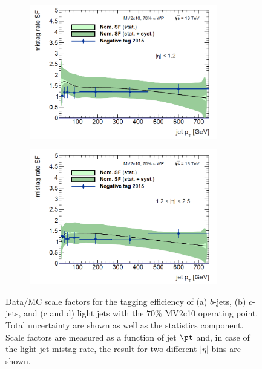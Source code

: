 \begin{figure}[h!]
\begin{subfigure}{0.5\textwidth}
  \centering
  \includegraphics[width=0.9\textwidth]{figures/Objects/LSFc.png}
  \caption{}
  \label{sec:obj:fig:lSFc}
\end{subfigure}
\begin{subfigure}{0.5\textwidth}
  \centering
  \includegraphics[width=0.9\textwidth]{figures/Objects/LSFf.png}
  \caption{}
  \label{sec:obj:fig:lSFf}
\end{subfigure}

\captionsetup{width=0.85\textwidth} \caption{\small Data/MC scale factors for the tagging efficiency of (a) $b$-jets, (b) $c$-jets, and (c and d) light jets with the $70\%$ MV2c10 operating point. Total uncertainty are shown as well as the statistics component. Scale factors are measured as a function of jet $\pt$ and, in case of the light-jet mistag rate, the result for two different $|\eta|$ bins are shown.}
\label{sec:obj:fig:btagsf}
\end{figure}
